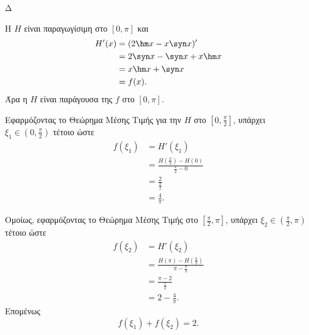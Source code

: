 \begin{thema}{Δ}
\begin{erwthma}
\item Η $H$ είναι παραγωγίσιμη στο $[0,\pi]$ και
\begin{align*}
H'(x)
&=(2\hm x-x\syn x)'\\
&=2\syn x-\syn x+x\hm x\\
&=x\hm x+\syn x\\
&=f(x).
\end{align*}
Άρα η $H$ είναι παράγουσα της $f$ στο $[0,\pi]$.

Εφαρμόζοντας το Θεώρημα Μέσης Τιμής για την $H$ στο $\left[0,\frac{\pi}{2}\right]$, υπάρχει $\xi_1\in\left(0,\frac{\pi}{2}\right)$ τέτοιο ώστε
\begin{align*}
f(\xi_1)
&=H'(\xi_1)\\
&=\frac{H\left(\frac{\pi}{2}\right)-H(0)}{\frac{\pi}{2}-0}\\
&=\frac{2}{\frac{\pi}{2}}\\
&=\frac{4}{\pi}.
\end{align*}

Ομοίως, εφαρμόζοντας το Θεώρημα Μέσης Τιμής στο $\left[\frac{\pi}{2},\pi\right]$, υπάρχει $\xi_2\in\left(\frac{\pi}{2},\pi\right)$ τέτοιο ώστε
\begin{align*}
f(\xi_2)
&=H'(\xi_2)\\
&=\frac{H(\pi)-H\left(\frac{\pi}{2}\right)}{\pi-\frac{\pi}{2}}\\
&=\frac{\pi-2}{\frac{\pi}{2}}\\
&=2-\frac{4}{\pi}.
\end{align*}
Επομένως
\[
{f(\xi_1)+f(\xi_2)=2}.
\]
\end{erwthma}
\end{thema}

